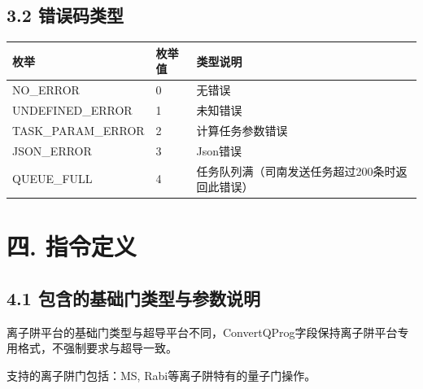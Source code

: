 \documentclass{ctexart}
\begin{document}
\subsection{3.2 错误码类型}

\begin{longtable}{|l|l|l|}
\hline
\textbf{\textbf{枚举}} & \textbf{\textbf{枚举值}} & \textbf{\textbf{类型说明}} \\
\hline
NO_ERROR & 0 & 无错误 \\
UNDEFINED_ERROR & 1 & 未知错误 \\
TASK_PARAM_ERROR & 2 & 计算任务参数错误 \\
JSON_ERROR & 3 & Json错误 \\
QUEUE_FULL & 4 & 任务队列满（司南发送任务超过200条时返回此错误） \\
\hline
\end{longtable}

\section{四. 指令定义}

\subsection{4.1 包含的基础门类型与参数说明}

离子阱平台的基础门类型与超导平台不同，ConvertQProg字段保持离子阱平台专用格式，不强制要求与超导一致。

支持的离子阱门包括：MS, Rabi等离子阱特有的量子门操作。
\end{document}
